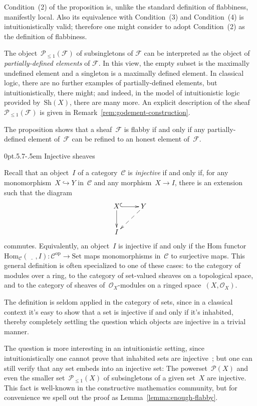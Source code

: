 \documentclass[10pt,reqno,a4paper]{amsbook}
\makeatletter
\theoremstyle{definition}
\theoremstyle{plain}
\theoremstyle{remark}
\renewcommand{\C}{\mathcal{C}}
\newcommand{\F}{\mathcal{F}}
\renewcommand{\O}{\mathcal{O}}
\renewcommand{\P}{\mathcal{P}}
\newcommand{\Hom}{\mathrm{Hom}}
\newcommand{\placeholder}{\underline{\quad}}
\newcommand{\Set}{\mathrm{Set}}
\newcommand{\Sh}{\mathrm{Sh}}
\newcommand{\op}{\mathrm{op}}
\newcommand{\?}{\,{:}\,}
\renewcommand{\_}{\mathpunct{.}\,}
\def\subsection{\@startsection{subsection}{2}%
  {0pt}{.5\linespacing\@plus.7\linespacing}{-.5em}%
  {\normalfont\bfseries}}
\makeatother
\begin{document}
Condition~(2) of the proposition is, unlike the standard definition of flabbiness,
manifestly local. Also its equivalence with Condition~(3) and Condition~(4) is
intuitionistically valid; therefore one might consider to adopt Condition~(2) as
the definition of flabbiness.

The object~$\P_{\leq 1}(\F)$ of subsingletons of $\F$ can be
interpreted as the object of \emph{partially-defined
elements} of $\F$. In this view, the empty subset is the maximally undefined
element and a singleton is a maximally defined element. In classical logic,
there are no further examples of partially-defined elements, but
intuitionistically, there might; and indeed, in the model of intuitionistic
logic provided by~$\Sh(X)$, there are many more. An explicit description of the
sheaf~$\P_{\leq 1}(\F)$ is given in Remark~\ref{rem:godement-construction}.

The proposition shows that a sheaf~$\F$ is flabby if and only if any
partially-defined element of~$\F$ can be refined to an honest element of~$\F$.


\subsection{Injective sheaves}

Recall that an object~$I$ of a category~$\C$ is \emph{injective} if and only if,
for any monomorphism~$X \hookrightarrow Y$ in~$\C$ and any morphism~$X \to I$, there
is an extension such that the diagram
\[ \xymatrix{
  X \ar@{^{(}->}[r]\ar[d] & Y \ar@{-->}[dl] \\
  I
} \]
commutes. Equivalently, an object~$I$ is injective if and only if the Hom
functor~$\Hom_\C(\placeholder, I) : \C^\op \to \Set$ maps monomorphisms in~$\C$ to
surjective maps. This general definition is often specialized to one of these cases:
to the category of modules over a ring, to the category of set-valued sheaves
on a topological space, and to the category of sheaves of~$\O_X$-modules on a
ringed space~$(X,\O_X)$.

The definition is seldom applied in the category of sets, since in a classical
context it's easy to show that a set is injective if and only if it's
inhabited, thereby completely settling the question which objects are
injective in a trivial manner.

The question is more interesting in an intuitionistic setting, since
intuitionistically one cannot prove that inhabited sets are
injective~\cite{aczel-et-al:injective}; but one can still verify that any set embeds
into an injective set: The powerset~$\P(X)$ and even the smaller
set~$\P_{\leq1}(X)$ of subsingletons of a given set~$X$ are injective. This
fact is well-known in the constructive mathematics community, but for
convenience we spell out the proof as Lemma~\ref{lemma:enough-flabby}.
\end{document}
